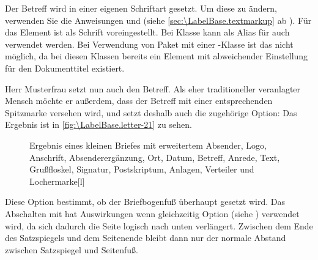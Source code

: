 \BeginIndexGroup
{}%
%
Der Betreff wird in einer eigenen Schriftart gesetzt. Um
diese zu ändern, verwenden Sie die Anweisungen
 und
 (siehe
\autoref{sec:\LabelBase.textmarkup} ab
). Für das
Element
 ist als
Schrift  voreingestellt. Bei Klasse
 kann als Alias für
 auch
 verwendet werden. Bei
Verwendung von Paket  mit einer \KOMAScript-Klasse ist das
nicht möglich, da bei diesen Klassen bereits ein Element
 mit abweichender Einstellung für den Dokumenttitel
existiert.
\EndIndexGroup

\begin{Example}
  Herr Musterfrau setzt nun auch den Betreff. Als eher traditioneller
  veranlagter Mensch möchte er außerdem, dass der Betreff mit einer
  entsprechenden Spitzmarke versehen wird, und setzt deshalb auch die
  zugehörige Option:%
  Das Ergebnis ist in \autoref{fig:\LabelBase.letter-21} zu sehen.
  \begin{figure}
    \setcapindent{0pt}%
    \begin{captionbeside}{Ergebnis eines kleinen Briefes mit erweitertem Absender,
        Logo, Anschrift, Absenderergänzung, Ort, Datum, Betreff,
        Anrede, Text, Grußfloskel, Signatur, Postskriptum, Anlagen, Verteiler
        und Lochermarke}[l]
    \end{captionbeside}
    \label{fig:\LabelBase.letter-21}
  \end{figure}
\end{Example}
%
\EndIndexGroup


\begin{Declaration}
\end{Declaration}
%
Diese Option bestimmt, ob der
Briefbogenfuß überhaupt gesetzt wird. Das Abschalten mit
 hat
Auswirkungen wenn gleichzeitig Option
 (siehe
) verwendet wird, da sich
dadurch die Seite logisch nach unten verlängert. Zwischen dem Ende des
Satzspiegels und dem Seitenende bleibt dann nur der normale Abstand zwischen
Satzspiegel und Seitenfuß.


